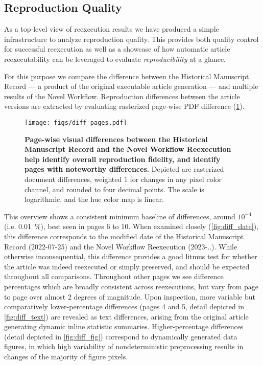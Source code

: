 \subsection{Reproduction Quality}


As a top-level view of reexecution results we have produced a simple infrastructure to analyze reproduction quality.
This provides both quality control for successful reexecution as well as a showcase of how automatic article reexecutability can be leveraged to evaluate \textit{reproducibility} at a glance.

For this purpose we compare the difference between the Historical Manuscript Record — a product of the original executable article generation — and multiple results of the Novel Workflow.
Reproduction differences between the article versions are extracted by evaluating rasterized page-wise PDF difference (\ref{fig:diff_pages}).


\begin{figure}
	\centering
	\texttt{[image: figs/diff\_pages.pdf]}
	\caption{
		\textbf{Page-wise visual differences between the Historical Manuscript Record and the Novel Workflow Reexecution help identify overall reproduction fidelity, and identify pages with noteworthy differences.}
		Depicted are rasterized document differences, weighted 1 for changes in any pixel color channel, and rounded to four decimal points.
		The scale is logarithmic, and the hue color map is linear.
	}
	\label{fig:diff_pages}
\end{figure}


This overview shows a consistent minimum baseline of differences, around $10^{-4}$ (i.e. \SI{0.01}{\percent}), best seen in pages 6 to 10.
When examined closely (\ref{fig:diff_date}), this difference corresponds to the modified date of the Historical Manuscript Record (2022-07-25) and the Novel Workflow Reexecution (2023-..).
While otherwise inconsequential, this difference provides a good litmus test for whether the article was indeed reexecuted or simply preserved, and should be expected throughout all comparisons.
Throughout other pages we see difference percentages which are broadly consistent across reexecutions, but vary from page to page over almost 2 degrees of magnitude.
Upon inspection, more variable but comparatively lower-percentage differences (pages 4 and 5, detail depicted in \cref{fig:diff_text}) are revealed as text differences, arising from the original article generating dynamic inline statistic summaries.
Higher-percentage differences (detail depicted in \cref{fig:diff_fig}) correspond to dynamically generated data figures, in which high variability of nondeterministic preprocessing results in changes of the majority of figure pixels.

